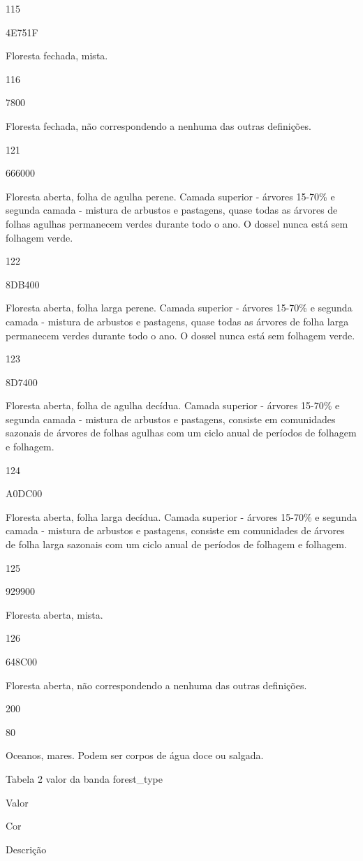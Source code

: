 \documentclass[
]{book}
\begin{document}
115

4E751F

Floresta fechada, mista.

116

7800

Floresta fechada, não correspondendo a nenhuma das outras definições.

121

666000

Floresta aberta, folha de agulha perene. Camada superior - árvores 15-70\% e segunda camada - mistura de arbustos e pastagens, quase todas as árvores de folhas agulhas permanecem verdes durante todo o ano. O dossel nunca está sem folhagem verde.

122

8DB400

Floresta aberta, folha larga perene. Camada superior - árvores 15-70\% e segunda camada - mistura de arbustos e pastagens, quase todas as árvores de folha larga permanecem verdes durante todo o ano. O dossel nunca está sem folhagem verde.

123

8D7400

Floresta aberta, folha de agulha decídua. Camada superior - árvores 15-70\% e segunda camada - mistura de arbustos e pastagens, consiste em comunidades sazonais de árvores de folhas agulhas com um ciclo anual de períodos de folhagem e folhagem.

124

A0DC00

Floresta aberta, folha larga decídua. Camada superior - árvores 15-70\% e segunda camada - mistura de arbustos e pastagens, consiste em comunidades de árvores de folha larga sazonais com um ciclo anual de períodos de folhagem e folhagem.

125

929900

Floresta aberta, mista.

126

648C00

Floresta aberta, não correspondendo a nenhuma das outras definições.

200

80

Oceanos, mares. Podem ser corpos de água doce ou salgada.

Tabela 2 valor da banda forest\_type

Valor

Cor

Descrição
\end{document}
